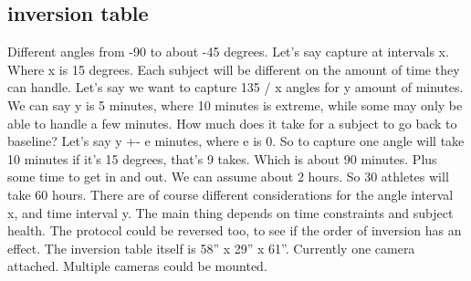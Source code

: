\subsection{inversion table}
Different angles from -90 to about -45 degrees. Let’s say capture at intervals x. Where x is 15 degrees. Each subject will be different on the amount of time they can handle. Let’s say we want to capture 135 / x angles for y amount of minutes. We can say y is 5 minutes, where 10 minutes is extreme, while some may only be able to handle a few minutes. How much does it take for a subject to go back to baseline? Let’s say y +- e minutes, where e is 0. So to capture one angle will take 10 minutes if it’s 15 degrees, that’s 9 takes. Which is about 90 minutes. Plus some time to get in and out. We can assume about 2 hours. So 30 athletes will take 60 hours. There are of course different considerations for the angle interval x, and time interval y. The main thing depends on time constraints and subject health. The protocol could be reversed too, to see if the order of inversion has an effect. The inversion table itself is 58” x 29” x 61”. Currently one camera attached. Multiple cameras could be mounted.

